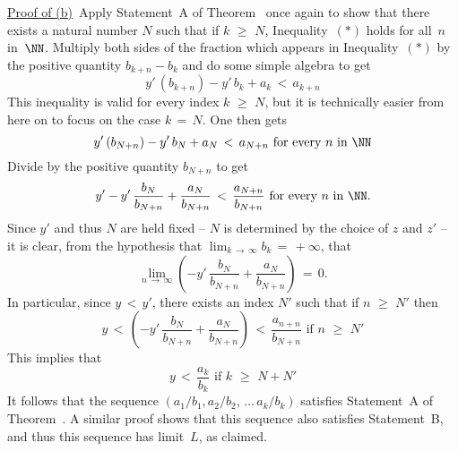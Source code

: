         \underline{Proof of (b)}\, Apply Statement~A of Theorem~ once again to show that
    there exists a natural number $N$ such that if $k\,\,{\geq}\,\,N$, Inequality~$({\ast})$ holds for all~$n$ in~${\NN}$.
    Multiply both sides of the fraction which appears in Inequality~$({\ast})$ by the positive quantity $b_{k+n}-b_{k}$ and do some simple algebra to get
        \begin{displaymath}
        y'\,(b_{k+n}) - y'\,b_{k} + a_{k}\,<\, a_{k+n}
        \end{displaymath}
    This inequality is valid for every index $k\,\,{\geq}\,\,N$, but it is technically easier from here on to focus on the case $k \,=\, N$.
    One then gets
        \begin{displaymath}
        y'\,(b_{N+n}) - y'\,b_{N} + a_{N}\,<\, a_{N+n} \mbox{ for every $n$ in ${\NN}$}
        \end{displaymath}
    Divide by the positive quantity $b_{N+n}$ to get
        \begin{displaymath}
        y' - y'\,\frac{b_{N}}{b_{N+n}} + \frac{a_{N}}{b_{N+n}}\,<\,\frac{a_{N+n}}{b_{N+n}} \mbox{ for every $n$ in ${\NN}$}.
        \end{displaymath}
    Since $y'$ and thus $N$ are held fixed -- $N$ is determined by the choice of $z$ and $z'$ -- it is clear,
    from the hypothesis that $\lim_{k \,{\rightarrow}\, {\infty}} b_{k} \,=\, +{\infty}$, that
        \begin{displaymath}
        \lim_{n \,{\rightarrow}\, {\infty}} \left(-y'\,\frac{b_{N}}{b_{N+n}} +
         \frac{a_{N}}{b_{N+n}}\right) \,=\, 0.
        \end{displaymath}
    In particular, since $y\,<\,y'$, there exists an index $N'$ such that if $n\,\,{\geq}\,\,N'$ then
        \begin{displaymath}
        y\,<\,\left(-y'\,\frac{b_{N}}{b_{N+n}} +
         \frac{a_{N}}{b_{N+n}}\right)\,<\,\frac{a_{n+n}}{b_{N+n}} \mbox{ if $n\,\,{\geq}\,\,N'$}
        \end{displaymath}
    This implies that
        \begin{displaymath}
        y\,<\,\frac{a_{k}}{b_{k}} \mbox{ if $k\,\,{\geq}\,\,N+N'$}
        \end{displaymath}
    It follows that the sequence $(a_{1}/b_{1}, a_{2}/b_{2},\,{\ldots}\,a_{k}/b_{k})$
    satisfies Statement~A of Theorem~. A similar proof shows that this sequence also satisfies Statement~B,
    and thus this sequence has limit~$L$, as claimed.


